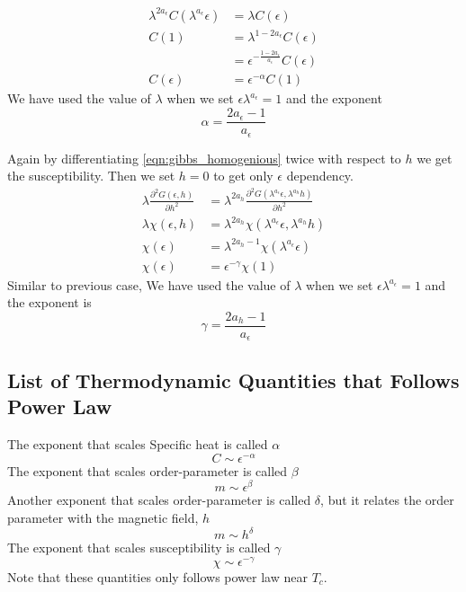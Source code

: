 	\begin{align}
		\lambda^{2 a_\epsilon} C(\lambda^{a_\epsilon} \epsilon) &= \lambda C(\epsilon) \nonumber \\
		C(1) &= \lambda^{1- 2 a_\epsilon} C(\epsilon) \nonumber \\
			 &= \epsilon^{-\frac{1-2 a_\epsilon}{a_\epsilon}} C(\epsilon) \nonumber \\
		C(\epsilon) &= \epsilon^{-\alpha} C(1) \label{eqn:specific_heat_and_alpha}
	\end{align}
	We have used the value of $\lambda$ when we set $\epsilon \lambda^{a_\epsilon}=1$ and the exponent
	\begin{equation}
		\alpha = \frac{2 a_\epsilon - 1}{a_\epsilon}
		\label{eqn:alpha}
	\end{equation}
	
	Again by differentiating \ref{eqn:gibbs_homogenious} twice with respect to $h$ we get the susceptibility. Then we set $h=0$ to get only $\epsilon$ dependency.
	\begin{align}
		\lambda \frac{\partial^2 G(\epsilon,h)}{\partial h^2} &= \lambda^{2 a_h} \frac{\partial^2 G(\lambda^{a_\epsilon} \epsilon, \lambda^{a_h} h)}{\partial h^2} \nonumber \\
		\lambda \chi(\epsilon, h) &= \lambda^{2 a_h} \chi(\lambda^{a_\epsilon}\epsilon, \lambda^{a_h} h) \nonumber \\
		\chi(\epsilon) &= \lambda^{2 a_h - 1} \chi(\lambda ^{a_\epsilon} \epsilon) \nonumber \\
		\chi(\epsilon) &= \epsilon^{-\gamma} \chi(1) 
		\label{eqn:susceptibility_homogeneous}
	\end{align}
	Similar to previous case, We have used the value of $\lambda$ when we set $\epsilon \lambda^{a_\epsilon}=1$ and the exponent is
	\begin{equation}
		\gamma = \frac{2 a_h -1}{a_\epsilon}
		\label{eqn:gamma}
	\end{equation}
	\subsection{List of Thermodynamic Quantities that Follows Power Law}
	
		The exponent that scales Specific heat is called $\alpha$ 
		\begin{equation}
			C \sim \epsilon^{-\alpha}
		\end{equation}
		The exponent that scales order-parameter is called $\beta$ 
		\begin{equation}
			m \sim \epsilon^{\beta}
		\end{equation}
		Another exponent that scales order-parameter is called $\delta$, but it relates the order parameter with the magnetic field, $h$
		\begin{equation}
			m \sim h^{\delta}
		\end{equation}
		The exponent that scales susceptibility is called $\gamma$ 
		\begin{equation}
			\chi \sim \epsilon^{-\gamma}
		\end{equation}
		Note that these quantities only follows power law near $T_c$.
